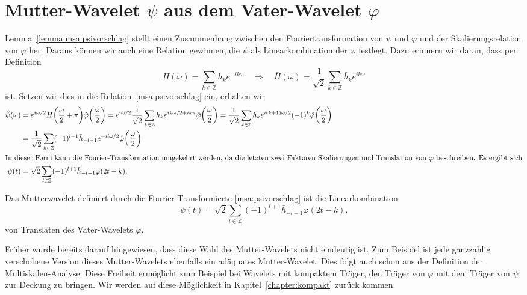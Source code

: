 \section{Mutter-Wavelet $\psi$ aus dem Vater-Wavelet $\varphi$}
Lemma~\ref{lemma:msa:psivorschlag} stellt einen Zusammenhang zwischen
den Fouriertransformation von $\psi$ und $\varphi$ und der Skalierungsrelation
von $\varphi$ her.
Daraus können wir auch eine Relation gewinnen, die $\psi$ als
Linearkombination der $\varphi$ festlegt.
Dazu erinnern wir daran, dass per Definition
\[
H(\omega) = \sum_{k\in\mathbb Z} h_k e^{-ik\omega} 
\quad\Rightarrow\quad
\bar{H}(\omega)
=
\frac{1}{\sqrt{2}}
\sum_{k\in\mathbb Z} \bar{h}_k e^{ik\omega} 
\]
ist.
Setzen wir dies in die Relation~\eqref{msa:psivorschlag} ein, erhalten wir
\begin{align*}
\hat{\psi}(\omega)
&=
e^{i\omega/2}
\bar{H}\biggl(\frac{\omega}2+\pi\biggr)
\hat{\varphi}\biggl(\frac{\omega}2\biggr)
=
e^{i\omega/2}
\frac{1}{\sqrt{2}}
\sum_{k\in\mathbb Z} \bar{h}_k e^{ik\omega/2 + ik\pi} 
\hat{\varphi}\biggl(\frac{\omega}2\biggr)
=
\frac{1}{\sqrt{2}}
\sum_{k\in\mathbb Z} \bar{h}_k e^{i(k+1)\omega/2} (-1)^k
\hat{\varphi}\biggl(\frac{\omega}2\biggr)
\\
&=
\frac{1}{\sqrt{2}}
\sum_{k\in\mathbb Z}
(-1)^{l+1}
\bar{h}_{-l-1} e^{-il\omega/2}
\hat{\varphi}\biggl(\frac{\omega}2\biggr)
\\
\intertext{In dieser Form kann die Fourier-Transformation umgekehrt werden,
da die letzten zwei Faktoren Skalierungen und Translation von $\varphi$
beschreiben.
Es ergibt sich}
\psi(t)
&=
\sqrt{2}\sum_{l\in\mathbb Z} (-1)^{l+1}\bar{h}_{-l-1} \varphi(2t-k).
\end{align*}

\begin{lemma}
\label{lemma:msa:psirelation}
Das Mutterwavelet definiert durch die Fourier-Transformierte
\eqref{msa:psivorschlag}
ist die Linearkombination
\begin{equation}
\psi(t)
=
\sqrt{2}\sum_{l\in\mathbb Z} (-1)^{l+1}\bar{h}_{-l-1} \varphi(2t-k).
\end{equation}
von Translaten des Vater-Wavelets $\varphi$.
\end{lemma}

Früher wurde bereits darauf hingewiesen, dass diese Wahl des Mutter-Wavelets
nicht eindeutig ist.
Zum Beispiel ist jede ganzzahlig verschobene Version dieses Mutter-Wavelets
ebenfalls ein adäquates Mutter-Wavelet.
Dies folgt auch schon aus der Definition der Multiskalen-Analyse.
Diese Freiheit ermöglicht zum Beispiel bei Wavelets mit kompaktem Träger,
den Träger von $\varphi$ mit dem Träger von $\psi$ zur Deckung zu
bringen.
Wir werden auf diese Möglichkeit in Kapitel~\ref{chapter:kompakt}
zurück kommen.


